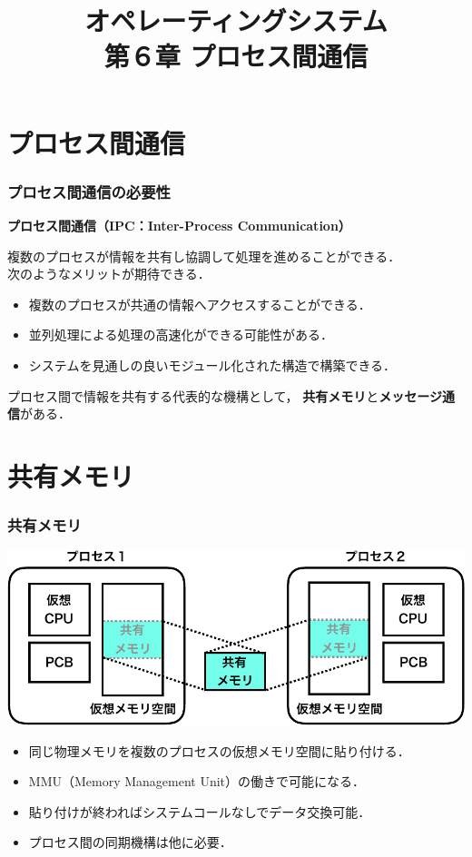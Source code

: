 \documentclass[dvipdfmx]{beamer}
\begin{document}
\title[OS]{オペレーティングシステム\\第６章 プロセス間通信}
\date{}

\begin{frame}
  \titlepage
\end{frame}


\section{プロセス間通信}
\begin{frame}
  \frametitle{プロセス間通信の必要性}

{\bf プロセス間通信（IPC：Inter-Process Communication）}

複数のプロセスが情報を共有し協調して処理を進めることができる．\\
次のようなメリットが期待できる．

\begin{itemize}
\item 複数のプロセスが共通の情報へアクセスすることができる．
\item 並列処理による処理の高速化ができる可能性がある．
\item システムを見通しの良いモジュール化された構造で構築できる．
\end{itemize}

プロセス間で情報を共有する代表的な機構として，
{\bf 共有メモリ}と{\bf メッセージ通信}がある．
\end{frame}

\section{共有メモリ}
\begin{frame}
  \frametitle{共有メモリ}
  \begin{center}
    \includegraphics[scale=0.6]{Fig/ipcShearedMemory-crop.pdf}
  \end{center}
  \begin{itemize}
  \item 同じ物理メモリを複数のプロセスの仮想メモリ空間に貼り付ける．
  \item MMU（Memory Management Unit）の働きで可能になる．
  \item 貼り付けが終わればシステムコールなしでデータ交換可能．
  \item プロセス間の同期機構は他に必要．
  \end{itemize}
\end{frame}
\end{document}

